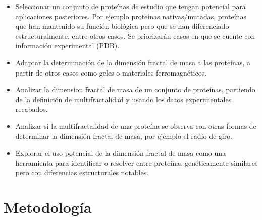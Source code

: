 \documentclass[11pt]{article}
\begin{document}
\begin{itemize}

\item Seleccionar un conjunto de prote\'{i}nas de estudio que tengan potencial para aplicaciones posteriores.
Por ejemplo prote\'{i}nas nativas/mutadas, prote\'{i}nas que han mantenido su funci\'{o}n biol\'{o}gica pero que se
han diferenciado estructuralmente, entre otros casos. Se priorizar\'{a}n casos en que se cuente con informaci\'{o}n
experimental (PDB).

\item Adaptar la determinaci\'{o}n de la dimensi\'{o}n fractal de masa a las prote\'{i}nas, a partir de otros casos como geles o materiales ferromagn\'{e}ticos.

\item Analizar la dimension fractal de masa de un conjunto de prote\'{i}nas, partiendo de la definici\'{o}n de multifractalidad y usando los datos experimentales recabados.

\item Analizar si la multifractalidad de una prote\'{i}na se observa con otras formas de determinar la
dimensi\'{o}n fractal de masa, por ejemplo el radio de giro.

\item Explorar el uso potencial de la dimensi\'{o}n fractal de masa como una herramienta para identificar
o resolver entre prote\'{i}nas gen\'{e}ticamente similares pero con diferencias estructurales notables.

\end{itemize}

\clearpage

\section{Metodolog\'{i}a}
\end{document}
